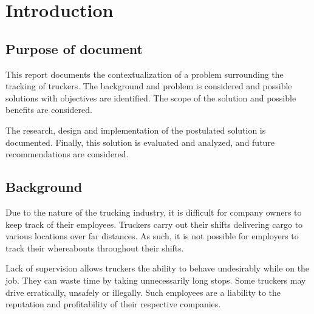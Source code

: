 \section{Introduction}
\subsection{Purpose of document}
This report documents the contextualization of a problem surrounding the tracking of truckers.
The background and problem is considered and possible solutions with objectives are identified. 
The scope of the solution and possible benefits are considered.

The research, design and implementation of the postulated solution is documented.
Finally, this solution is evaluated and analyzed, and future recommendations are considered.

\subsection{Background}
Due to the nature of the trucking industry, it is difficult for company owners to keep track of their employees.
Truckers carry out their shifts delivering cargo to various locations over far distances.
As such, it is not possible for employers to track their whereabouts throughout their shifts.

Lack of supervision allows truckers the ability to behave undesirably while on the job.
They can waste time by taking unnecessarily long stops.
Some truckers may drive erratically, unsafely or illegally.
Such employees are a liability to the reputation and profitability of their respective companies.

